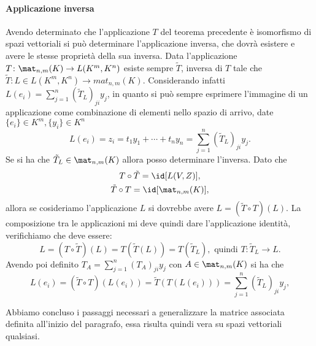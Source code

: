 \paragraph{Applicazione inversa} %
Avendo determinato che l'applicazione $T$ del teorema precedente è isomorfismo di spazi vettoriali si può determinare l'applicazione inversa, che dovrà esistere e avere le stesse proprietà della sua inversa.
Data l'applicazione $T\colon \mat_{n,m}(K)\to L(K^m,K^n)$ esiste sempre $\tilde{T}$, inversa di $T$ tale che $\tilde{T}\colon L\in L(K^m,K^n)\to mat_{n,m}(K)$.
Considerando infatti $L(e_i) = \sum_{j=1}^n(\tilde{T}_L)_{ji}y_j$, in quanto si può sempre esprimere l'immagine di un applicazione come combinazione di elementi nello spazio di arrivo, date $\{e_i\}\in K^m,\{y_i\}\in K^n$
\begin{equation*}
	L(e_i) = z_i = t_1 y_1 + \cdots + t_n y_n = \sum_{j=1}^n(\tilde{T}_L)_{ji}y_j.
\end{equation*}
Se si ha che $\tilde{T}_L\in \mat_{n,m}(K)$ allora posso determinare l'inversa.
Dato che
\begin{gather*}
	T\circ \tilde{T} = \id [L(V,Z)],\\
	\tilde{T}\circ T = \id [\mat_{n,m}(K)],
\end{gather*}
allora se cosideriamo l'applicazione $L$ si dovrebbe avere $L=(\tilde{T}\circ T)(L)$.
La composizione tra le applicazioni mi deve quindi dare l'applicazione identità, verifichiamo che deve essere:
\begin{equation*}
	L=(T\circ \tilde{T})(L) = T(\tilde{T}(L)) = T(\tilde{T}_L),\text{ quindi }T\colon \tilde{T}_L\to L. 
\end{equation*}
Avendo poi definito $T_A =  \sum_{j=1}^n(T_A)_{ji}y_j$ con $A\in \mat_{n,m}(K)$ si ha che
\begin{equation*}
	L(e_i) = (\tilde{T}\circ T)(L(e_i)) = \tilde{T}( T(L(e_i))) = \sum_{j=1}^n(\tilde{T}_L)_{ji}y_j,
\end{equation*}

Abbiamo concluso i passaggi necessari a generalizzare la matrice associata definita all'inizio del paragrafo, essa risulta quindi vera su spazi vettoriali qualsiasi.


